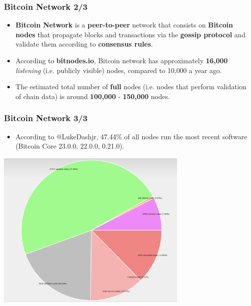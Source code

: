 \documentclass{beamer}
\begin{document}
\begin{frame}
  \frametitle{Bitcoin Network 2/3}
  \begin{itemize}
  \item \textbf{Bitcoin Network} is a \textbf{peer-to-peer} network that
    consists on \textbf{Bitcoin nodes} that propagate blocks and transactions
    via the \textbf{gossip protocol} and validate them according to
    \textbf{consensus rules}.
  \item According to \textbf{bitnodes.io}, Bitcoin network has approximately
    \textbf{16,000} \textit{listening} (i.e. publicly visible) nodes, compared
    to 10,000 a year ago.
  \item The estimated total number of \textbf{full} nodes (i.e. nodes that
    perform validation of chain data) is around \textbf{100,000} -
    \textbf{150,000} nodes.
  \end{itemize}
\end{frame}

\begin{frame}
  \frametitle{Bitcoin Network 3/3}
  \begin{itemize}
  \item According to @LukeDashjr, 47.44\% of all nodes run the most recent
    software (Bitcoin Core 23.0.0, 22.0.0, 0.21.0).
  \end{itemize}
  \begin{center}
    \includegraphics[width=0.7\textwidth]{nodes}
  \end{center}
\end{frame}
\end{document}
